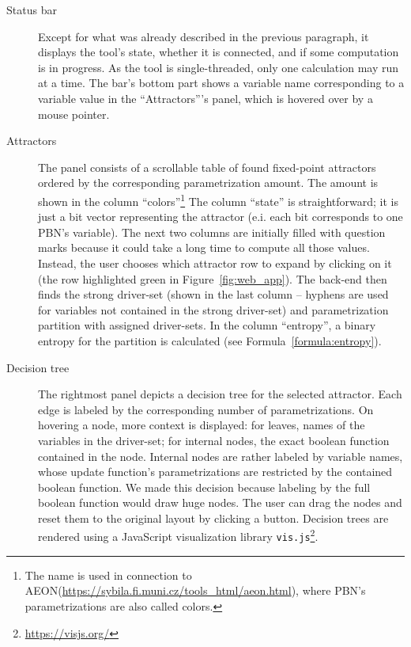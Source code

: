 \documentclass[
	digital, oneside, nosansbold, nocolorbold, nolot, nolof
]{fithesis4}
\theoremstyle{definition}
\theoremstyle{definition}
\begin{document}
\begin{description}
\item[Status bar] Except for what was already described in the previous
    paragraph, it displays the tool's state, whether it is connected, and if
    some computation is in progress. As the tool is single-threaded, only one
    calculation may run at a time. The bar's bottom part shows a variable name
    corresponding to a variable value in the \enquote{Attractors}'s panel,
    which is hovered over by a mouse pointer.
\item[Attractors] The panel consists of a scrollable table of found fixed-point
    attractors ordered by the corresponding parametrization amount. The amount
    is shown in the column \enquote{colors}\footnote{The name is used in
        connection to
        AEON(\url{https://sybila.fi.muni.cz/tools_html/aeon.html}), where PBN's
    parametrizations are also called colors.} The column \enquote{state} is
    straightforward; it is just a bit vector representing the attractor (e.i.
    each bit corresponds to one PBN's variable). The next two columns are
    initially filled with question marks because it could take a long time to
    compute all those values. Instead, the user chooses which attractor row to
    expand by clicking on it (the row highlighted green in
    Figure~\ref{fig:web_app}). The back-end then finds the strong driver-set
    (shown in the last column -- hyphens are used for variables not contained
    in the strong driver-set) and parametrization partition with assigned
    driver-sets. In the column \enquote{entropy}, a binary entropy for the
    partition is calculated (see Formula~\ref{formula:entropy}).
\item[Decision tree] The rightmost panel depicts a decision tree for the
selected attractor. Each edge is labeled by the corresponding number of
parametrizations. On hovering a node, more context is displayed: for leaves,
names of the variables in the driver-set; for internal nodes, the exact boolean
function contained in the node. Internal nodes are rather labeled by variable
names, whose update function's parametrizations are restricted by the contained
boolean function. We made this decision because labeling by the full boolean
function would draw huge nodes. The user can drag the nodes and reset them to
the original layout by clicking a button. Decision trees are rendered using a
JavaScript visualization library
\texttt{vis.js}\footnote{\url{https://visjs.org/}}.
\end{description}
\end{document}
